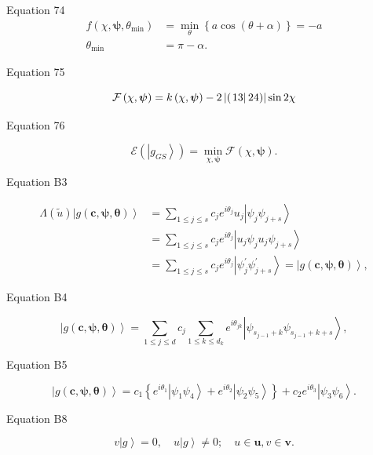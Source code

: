 \documentclass{article}
\begin{document}
Equation 74%
\begin{align*}
f\left( \chi ,\boldsymbol{\psi },\theta _{\min }\right) & =\min_{\theta
}\left\{ a\cos \left( \theta +\alpha \right) \right\} =-a \\
\theta _{\min }& =\pi -\alpha .
\end{align*}

Equation 75

\[
\mathcal{F}\left( \chi ,\boldsymbol{\psi }\right) =k\left( \chi ,\boldsymbol{%
\psi }\right) -2\left\vert \left( \left. 13\right\vert 24\right) \right\vert
\sin 2\chi 
\]

Equation 76

\[
\mathcal{E}\left( \left\vert g_{GS}\right\rangle \right) =\min_{\chi ,%
\boldsymbol{\psi }}\mathcal{F}\left( \chi ,\boldsymbol{\psi }\right) .
\]

Equation B3

\begin{align*}
\Lambda \left( \tilde{u}\right) \left\vert g\left( \boldsymbol{c},%
\boldsymbol{\psi },\boldsymbol{\theta }\right) \right\rangle & =\sum_{1\leq
j\leq s}c_{j}e^{i\theta _{j}}u_{j}\left\vert \psi _{j}\psi
_{j+s}\right\rangle  \\
& =\sum_{1\leq j\leq s}c_{j}e^{i\theta _{j}}\left\vert u_{j}\psi
_{j}u_{j}\psi _{j+s}\right\rangle  \\
& =\sum_{1\leq j\leq s}c_{j}e^{i\theta _{j}}\left\vert \psi _{j}^{\prime
}\psi _{j+s}^{\prime }\right\rangle =\left\vert g\left( \boldsymbol{c},%
\boldsymbol{\psi },\boldsymbol{\theta }\right) \right\rangle ,
\end{align*}

Equation B4

\[
\left\vert g\left( \boldsymbol{c},\boldsymbol{\psi },\boldsymbol{\theta }%
\right) \right\rangle =\sum_{1\leq j\leq d}c_{j}\sum_{1\leq k\leq
d_{k}}e^{i\theta _{jk}}\left\vert \psi _{s_{j-1}+k}\psi
_{s_{j-1}+k+s}\right\rangle ,
\]

Equation B5

\[
\left\vert g\left( \boldsymbol{c},\boldsymbol{\psi },\boldsymbol{\theta }%
\right) \right\rangle =c_{1}\left\{ e^{i\theta _{1}}\left\vert \psi _{1}\psi
_{4}\right\rangle +e^{i\theta _{2}}\left\vert \psi _{2}\psi
_{5}\right\rangle \right\} +c_{2}e^{i\theta _{3}}\left\vert \psi _{3}\psi
_{6}\right\rangle .
\]

Equation B8

\[
v\left\vert g\right\rangle =0,\quad u\left\vert g\right\rangle \neq 0;\quad
u\in \boldsymbol{u},v\in \boldsymbol{v.}
\]
\end{document}
